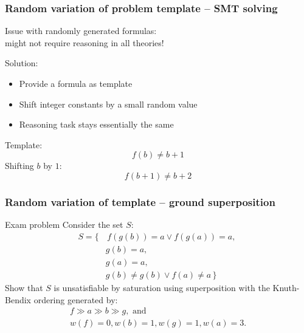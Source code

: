 \documentclass[xcolor={table}]{beamer}
\begin{document}
\begin{frame}
    \frametitle{Random variation of problem template -- SMT solving}

    Issue with randomly generated formulas: \\
    might not require reasoning in all theories!
    \bigskip
    \pause

    Solution:
    \begin{itemize}
        \item
            Provide a formula as template
        \item
            Shift integer constants by a small random value
        \item
            Reasoning task stays essentially the same
    \end{itemize}

    \begin{example}
        Template:
        \[ f(b) \neq b+1 \]
        Shifting $b$ by $1$:
        \[ f(b+1) \neq b+2 \]
    \end{example}
\end{frame}



\begin{frame}
  \frametitle{Random variation of template -- ground superposition}
    \begin{block}{Exam problem}
      Consider the set $S$:
      \vspace*{-0.5em}
      \begin{align*}
        S = \{& \, f(g(b)) = a \lor f(g(a)) = a,
      ~\\~
      & g(b) = a,
      ~\\~
      & g(a) = a,
      ~\\~
        & g(b)  \neq  g(b) \lor f(a)  \neq  a \,\}
      \end{align*}
      Show that $S$ is unsatisfiable by saturation using superposition
      with the Knuth-Bendix ordering generated by:
      \vspace*{-0.5em}
      \begin{gather*}
        f \gg a \gg b \gg g, \text{ and} \\
        w(f) = 0, w(b) = 1, w(g) = 1, w(a) = 3.
      \end{gather*}
    \end{block}

\end{frame}
\end{document}
